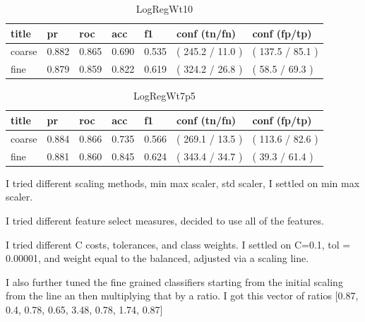 \documentclass[ms]{nuthesis}
\begin{document}
\FloatBarrier
\begin{table}[h]
\centering
\begin{tabular}{|l||l||l||l||l||l||l|}\toprule
title & pr & roc & acc & f1 & conf (tn/fn) & conf (fp/tp) \\ \midrule
coarse & 0.882 & 0.865 & 0.690 & 0.535 & ( 245.2 / 11.0 ) & ( 137.5 / 85.1 ) \\
fine & 0.879 & 0.859 & 0.822 & 0.619 & ( 324.2 / 26.8 ) & ( 58.5 / 69.3 ) \\ \bottomrule
\end{tabular}
\caption{LogRegWt10}
\label{tab:LogRegWt10}
\end{table}
\FloatBarrier


\FloatBarrier
\begin{table}[h]
\centering
\begin{tabular}{|l||l||l||l||l||l||l|}\toprule
title & pr & roc & acc & f1 & conf (tn/fn) & conf (fp/tp) \\ \midrule
coarse & 0.884 & 0.866 & 0.735 & 0.566 & ( 269.1 / 13.5 ) & ( 113.6 / 82.6 ) \\
fine & 0.881 & 0.860 & 0.845 & 0.624 & ( 343.4 / 34.7 ) & ( 39.3 / 61.4 ) \\ \bottomrule
\end{tabular}
\caption{LogRegWt7p5}
\label{tab:LogRegWt7p5}
\end{table}
\FloatBarrier



\par I tried different scaling methods, min max scaler, std scaler, I settled on min max scaler.
\par I tried different feature select measures, decided to use all of the features.
\par I tried different C costs, tolerances, and class weights. I settled on C=0.1, tol = 0.00001,
and weight equal to the balanced, adjusted via a scaling line.
\par I also further tuned the fine grained classifiers starting from the initial scaling from the
line an then multiplying that by a ratio.
I got this vector of ratios
[0.87, 0.4, 0.78, 0.65, 3.48, 0.78, 1.74, 0.87]

\break
\end{document}
